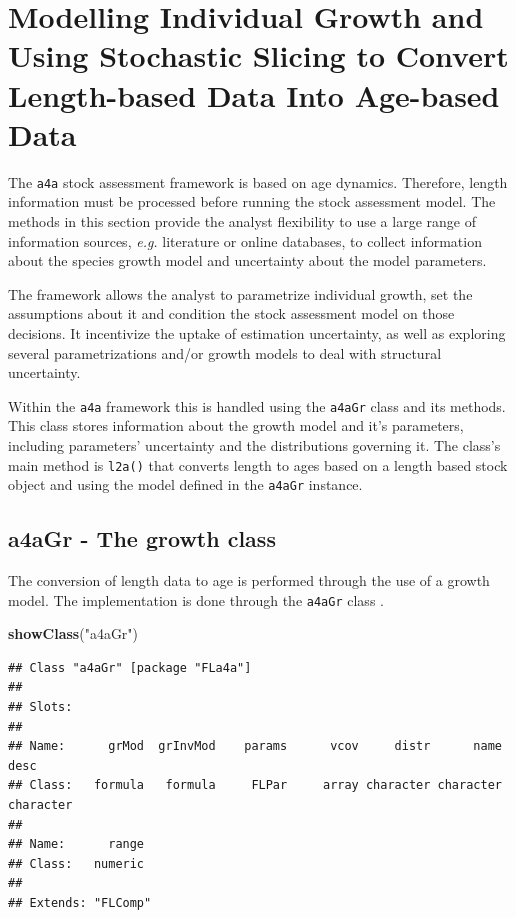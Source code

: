 \documentclass[
]{book}
\newenvironment{Shaded}{\begin{snugshade}}{\end{snugshade}}
\newcommand{\FunctionTok}[1]{\textcolor[rgb]{0.13,0.29,0.53}{\textbf{#1}}}
\newcommand{\NormalTok}[1]{#1}
\newcommand{\StringTok}[1]{\textcolor[rgb]{0.31,0.60,0.02}{#1}}
\begin{document}
\hypertarget{growth}{%
\chapter{Modelling Individual Growth and Using Stochastic Slicing to Convert Length-based Data Into Age-based Data}\label{growth}}

The \texttt{a4a} stock assessment framework is based on age dynamics. Therefore, length information must be processed before running the stock assessment model. The methods in this section provide the analyst flexibility to use a large range of information sources, \emph{e.g.} literature or online databases, to collect information about the species growth model and uncertainty about the model parameters.

The framework allows the analyst to parametrize individual growth, set the assumptions about it and condition the stock assessment model on those decisions. It incentivize the uptake of estimation uncertainty, as well as exploring several parametrizations and/or growth models to deal with structural uncertainty.

Within the \texttt{a4a} framework this is handled using the \texttt{a4aGr} class and its methods. This class stores information about the growth model and it's parameters, including parameters' uncertainty and the distributions governing it. The class's main method is \texttt{l2a()} that converts length to ages based on a length based stock object and using the model defined in the \texttt{a4aGr} instance.

\hypertarget{a4agr---the-growth-class}{%
\section{a4aGr - The growth class}\label{a4agr---the-growth-class}}

The conversion of length data to age is performed through the use of a growth model. The implementation is done through the \texttt{a4aGr} class .

\begin{Shaded}
\begin{Highlighting}[]
\FunctionTok{showClass}\NormalTok{(}\StringTok{"a4aGr"}\NormalTok{)}
\end{Highlighting}
\end{Shaded}

\begin{verbatim}
## Class "a4aGr" [package "FLa4a"]
## 
## Slots:
##                                                                             
## Name:      grMod  grInvMod    params      vcov     distr      name      desc
## Class:   formula   formula     FLPar     array character character character
##                 
## Name:      range
## Class:   numeric
## 
## Extends: "FLComp"
\end{verbatim}
\end{document}
